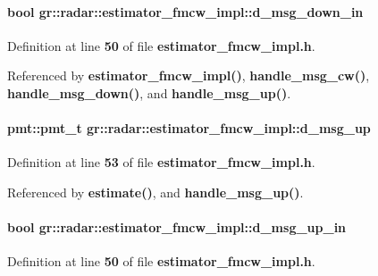\paragraph[{d\+\_\+msg\+\_\+down\+\_\+in}]{\setlength{\rightskip}{0pt plus 5cm}bool gr\+::radar\+::estimator\+\_\+fmcw\+\_\+impl\+::d\+\_\+msg\+\_\+down\+\_\+in}\label{classgr_1_1radar_1_1estimator__fmcw__impl_a55c66ecaa3ee348f16b577865afb40f0}


Definition at line {\bf 50} of file {\bf estimator\+\_\+fmcw\+\_\+impl.\+h}.



Referenced by {\bf estimator\+\_\+fmcw\+\_\+impl()}, {\bf handle\+\_\+msg\+\_\+cw()}, {\bf handle\+\_\+msg\+\_\+down()}, and {\bf handle\+\_\+msg\+\_\+up()}.

\paragraph[{d\+\_\+msg\+\_\+up}]{\setlength{\rightskip}{0pt plus 5cm}pmt\+::pmt\+\_\+t gr\+::radar\+::estimator\+\_\+fmcw\+\_\+impl\+::d\+\_\+msg\+\_\+up}\label{classgr_1_1radar_1_1estimator__fmcw__impl_a8a063ad341dd38de217830899bc39332}


Definition at line {\bf 53} of file {\bf estimator\+\_\+fmcw\+\_\+impl.\+h}.



Referenced by {\bf estimate()}, and {\bf handle\+\_\+msg\+\_\+up()}.

\paragraph[{d\+\_\+msg\+\_\+up\+\_\+in}]{\setlength{\rightskip}{0pt plus 5cm}bool gr\+::radar\+::estimator\+\_\+fmcw\+\_\+impl\+::d\+\_\+msg\+\_\+up\+\_\+in}\label{classgr_1_1radar_1_1estimator__fmcw__impl_a42da9904d5ff1efc7cec9dd523b41c1d}


Definition at line {\bf 50} of file {\bf estimator\+\_\+fmcw\+\_\+impl.\+h}.




